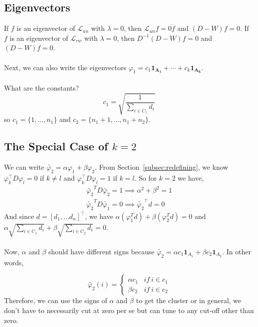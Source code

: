 \documentclass[12pt]{article}
\theoremstyle{plain}
\begin{document}
\subsection{Eigenvectors}

If $ f $ is an eigenvector of $ \mathcal{L}_{un} $ with $ \lambda = 0 $, then $ \mathcal{L}_{un} f = 0 \dot f $ and $ (D - W)f = 0 $.
If $ f $ is an eigenvector of $ \mathcal{L}_{rw} $ with $ \lambda = 0 $, then $ D^{-1} (D - W) f = 0 $ and $ (D - W)f = 0 $.
\\ \\
Next, we can also write the eigenvectors $ \varphi_{1} = c_1 \mathbf{1_{A_{1}}} + \cdots + c_k \mathbf{1_{A_{k}}} $.
\\ \\
What are the constants?
\[
c_1 = \sqrt{\frac{1}{\sum_{i \in C_1}d_i}}
\]
so $ c_1 = \{ 1, \ldots, n_1 \} $ and $ c_2 = \{ n_1 + 1, \ldots, n_1 + n_2 \} $.

\subsection{The Special Case of $ k = 2$}

We can write $ \widetilde{\varphi_2} = \alpha \varphi_{1}  + \beta \varphi_{2} $.
From Section~\ref{subsec:redefining}, we know $ \varphi_k^{\intercal} D \varphi_l = 0 $ if $ k \neq l $ and $ \varphi_k^{\intercal} D \varphi_l = 1 $ if $ k = l $. So for $k=2$ we have,
\begin{align*}
\widetilde{\varphi_2}^T D \widetilde{\varphi_2} = 1 \implies \alpha^2 + \beta^2 = 1 \\
\widetilde{\varphi_2}^T D \widetilde{\varphi_1} = 0 \implies \widetilde{\varphi_2}^{\intercal}d = 0
\end{align*}
And since $ d = [d_1, \ldots d_n]^{\intercal} $, we have $ \alpha(\varphi_{1}^Td) + \beta(\varphi_{2}^Td) = 0$ and $\alpha\sqrt{\sum_{i \in C_1}d_i}+\beta\sqrt{\sum_{i \in C_2}d_i} = 0$.
\\ \\
Now, $ \alpha $ and $ \beta $ should have different signs because $ \widetilde{\varphi_2} = \alpha c_1 \mathbf{1}_{A_1} + \beta c_2 \mathbf{1}_{A_2} $. In other words,

\[
\widetilde{\varphi_2} (i) =
\begin{cases}
  \alpha c_1 & if~ i \in c_1 \\
  \beta c_2 & if~ i \in c_2
\end{cases}
\]
Therefore, we can use the signs of $\alpha$ and $\beta$ to get the cluster or in general, we don't have to necessarily cut at zero per se but can tune to any cut-off other than zero.
\end{document}
